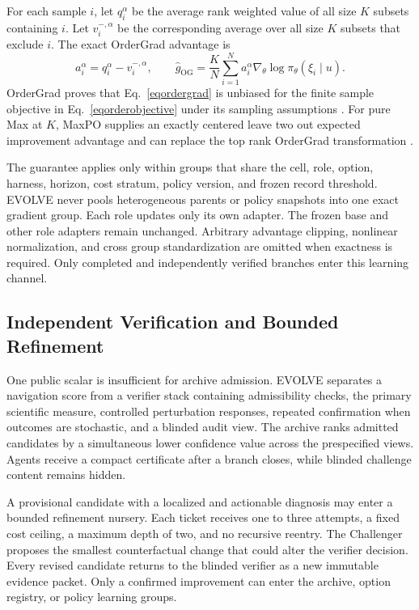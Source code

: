 \documentclass{article}
\begin{document}
For each sample $i$, let $q_i^{\alpha}$ be the average rank weighted value of all size $K$ subsets containing $i$. Let $v_i^{-,\alpha}$ be the corresponding average over all size $K$ subsets that exclude $i$. The exact OrderGrad advantage is
\begin{equation}
a_i^{\alpha}
=
q_i^{\alpha}-v_i^{-,\alpha},
\qquad
\widehat g_{\mathrm{OG}}
=
\frac{K}{N}
\sum_{i=1}^{N}
a_i^{\alpha}
\nabla_{\theta}\log\pi_{\theta}(\xi_i\mid u).
\label{eqordergrad}
\end{equation}
OrderGrad proves that Eq.~\eqref{eqordergrad} is unbiased for the finite sample objective in Eq.~\eqref{eqorderobjective} under its sampling assumptions \citep{parmas2026}. For pure Max at $K$, MaxPO supplies an exactly centered leave two out expected improvement advantage and can replace the top rank OrderGrad transformation \citep{takashiro2026}.

The guarantee applies only within groups that share the cell, role, option, harness, horizon, cost stratum, policy version, and frozen record threshold. EVOLVE never pools heterogeneous parents or policy snapshots into one exact gradient group. Each role updates only its own adapter. The frozen base and other role adapters remain unchanged. Arbitrary advantage clipping, nonlinear normalization, and cross group standardization are omitted when exactness is required. Only completed and independently verified branches enter this learning channel.

\subsection{Independent Verification and Bounded Refinement}
\label{secverification}

One public scalar is insufficient for archive admission. EVOLVE separates a navigation score from a verifier stack containing admissibility checks, the primary scientific measure, controlled perturbation responses, repeated confirmation when outcomes are stochastic, and a blinded audit view. The archive ranks admitted candidates by a simultaneous lower confidence value across the prespecified views. Agents receive a compact certificate after a branch closes, while blinded challenge content remains hidden.

A provisional candidate with a localized and actionable diagnosis may enter a bounded refinement nursery. Each ticket receives one to three attempts, a fixed cost ceiling, a maximum depth of two, and no recursive reentry. The Challenger proposes the smallest counterfactual change that could alter the verifier decision. Every revised candidate returns to the blinded verifier as a new immutable evidence packet. Only a confirmed improvement can enter the archive, option registry, or policy learning groups.
\end{document}
